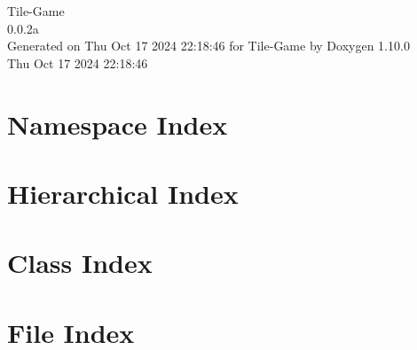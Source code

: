 \documentclass[twoside]{book}
\newcommand{\+}{\discretionary{\mbox{\scriptsize$\hookleftarrow$}}{}{}}
\newcommand{\clearemptydoublepage}{%
    \newpage{\pagestyle{empty}\cleardoublepage}%
  }
\begin{document}
  \raggedbottom
    \hypersetup{pageanchor=false,
                bookmarksnumbered=true,
                pdfencoding=unicode
               }
  \begin{titlepage}
  \vspace*{7cm}
  \begin{center}%
  {\Large Tile-\/\+Game}\\
  [1ex]\large 0.\+0.\+2a \\
  \vspace*{1cm}
  {\large Generated on Thu Oct 17 2024 22\+:18\+:46 for Tile-\/\+Game by Doxygen 1.10.0}\\
    \vspace*{0.5cm}
    {\small Thu Oct 17 2024 22:18:46}
  \end{center}
  \end{titlepage}
  \clearemptydoublepage
  \tableofcontents
  \clearemptydoublepage
  \hypersetup{pageanchor=true}
\chapter{Namespace Index}

\chapter{Hierarchical Index}

\chapter{Class Index}

\chapter{File Index}

\end{document}
